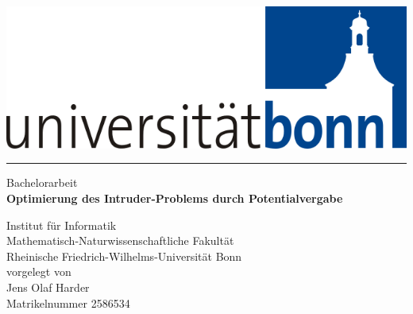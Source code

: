 
\begin{titlepage}

\renewcommand{\baselinestretch}{2}\normalsize

\begin{center}%
  \includegraphics[scale=0.3]{bilder/logo.png}
\end{center}

\rule{\textwidth}{0.4pt}

\vspace{0.2cm}

\begin{center}
    {\LARGE Bachelorarbeit} \\
    \textbf{\Huge Optimierung des Intruder-Problems durch Potentialvergabe}
\end{center}

\vspace{0.5cm}

\begin{center}

    \vspace{0.5cm}
    Institut für Informatik \\
    Mathematisch-Naturwissenschaftliche Fakultät \\
    Rheinische Friedrich-Wilhelms-Universität Bonn \\[0.5cm]
    vorgelegt von \\
    \vspace{0.5cm}
    {\Large Jens Olaf Harder} \\
    Matrikelnummer  2586534 \\
\end{center}


%
%


\end{titlepage}
